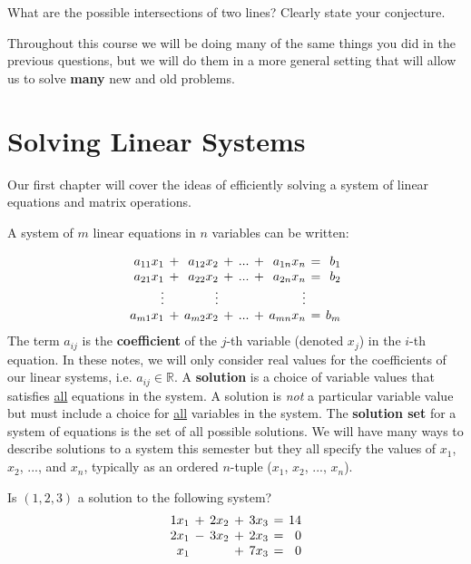 \begin{question} What are the possible intersections of two lines? Clearly state your conjecture.
\end{question}

Throughout this course we will be doing many of the same things you did in the previous questions, but we will do them in a more general setting that will allow us to solve \textbf{many} new and old problems.

\newpage
\section{Solving Linear Systems}
Our first chapter will cover the ideas of efficiently solving a system of linear equations and matrix operations.

A system of $m$ linear equations in $n$ variables can be written:

\begin{equation*}
\setlength{\arraycolsep}{2pt}
\begin{array}{rcrcrcrcr}
  a_{11} x_1  &+& a_{12} x_2 &+& ... &+&  a_{1n}x_n &=& b_1 \\
  a_{21} x_1  &+& a_{22} x_2 &+& ... &+&  a_{2n}x_n &=& b_2 \\
  \vdots  & & \vdots & &  & &  \vdots &&  \\
  a_{m1} x_1  &+& a_{m2} x_2 &+& ... &+&  a_{mn}x_n &=& b_m
\end{array}
\end{equation*}
The term $a_{ij}$ is the \textbf{coefficient} of the $j$-th variable (denoted $x_j$) in the $i$-th equation. In these notes, we will only consider real values for the coefficients of our linear systems, i.e. $a_{ij} \in \mathbb{R}$. A \textbf{solution} is a choice of variable values that satisfies \underline{all} equations in the system. A solution is \emph{not} a particular variable value but must include a choice for \underline{all} variables in the system. The \textbf{solution set} for a system of equations is the set of all possible solutions. We will have many ways to describe solutions to a system this semester but they all specify the values of $x_1$, $x_2$, ..., and $x_n$, typically as an ordered $n$-tuple ($x_1$, $x_2$, ..., $x_n$).

\bq Is $(1,2,3)$ a solution to the following system?
\begin{equation*}
\setlength{\arraycolsep}{2pt}
\begin{array}{rcrcrcrcr}
  1 x_1  &+& 2 x_2 &+& 3 x_3 &=& 14 \\ %
  2 x_1  &-& 3 x_2 &+& 2 x_3 &=& 0 \\
   x_1   & &       &+& 7 x_3 &=& 0
\end{array}
\end{equation*}
\eq

